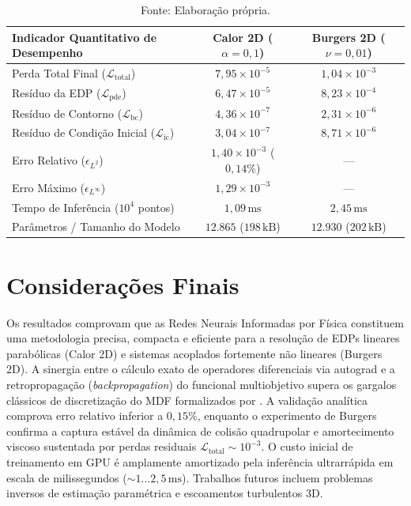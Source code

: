 \documentclass[a4paper, 12pt, twoside]{article}
\begin{document}
\begin{table}[!ht]
\centering
\caption{Síntese dos indicadores quantitativos de convergência e desempenho das PINNs.}
\label{tab:comparison}
\footnotesize
\setlength{\tabcolsep}{3.5pt}
\begin{tabular}{lcc}
\toprule
\textbf{Indicador Quantitativo de Desempenho} & \textbf{Calor 2D ($\alpha = 0{,}1$)} & \textbf{Burgers 2D ($\nu = 0{,}01$)} \\
\midrule
Perda Total Final ($\mathcal{L}_{\mathrm{total}}$) & $7{,}95 \times 10^{-5}$ & $1{,}04 \times 10^{-3}$ \\
Resíduo da EDP ($\mathcal{L}_{\mathrm{pde}}$) & $6{,}47 \times 10^{-5}$ & $8{,}23 \times 10^{-4}$ \\
Resíduo de Contorno ($\mathcal{L}_{\mathrm{bc}}$) & $4{,}36 \times 10^{-7}$ & $2{,}31 \times 10^{-6}$ \\
Resíduo de Condição Inicial ($\mathcal{L}_{\mathrm{ic}}$) & $3{,}04 \times 10^{-7}$ & $8{,}71 \times 10^{-6}$ \\
Erro Relativo ($\epsilon_{L^2}$) & $1{,}40 \times 10^{-3}$ ($0{,}14\%$) & --- \\
Erro Máximo ($\epsilon_{L^\infty}$) & $1{,}29 \times 10^{-3}$ & --- \\
Tempo de Inferência ($10^4$ pontos) & $1{,}09\,\text{ms}$ & $2{,}45\,\text{ms}$ \\
Parâmetros / Tamanho do Modelo & $12.865$ ($198\,\text{kB}$) & $12.930$ ($202\,\text{kB}$) \\
\bottomrule
\end{tabular}
\caption*{Fonte: Elaboração própria.}
\end{table}

\section{Considerações Finais}

Os resultados comprovam que as Redes Neurais Informadas por Física constituem uma metodologia precisa, compacta e eficiente para a resolução de EDPs lineares parabólicas (Calor 2D) e sistemas acoplados fortemente não lineares (Burgers 2D). A sinergia entre o cálculo exato de operadores diferenciais via autograd e a retropropagação (\textit{backpropagation}) do funcional multiobjetivo supera os gargalos clássicos de discretização do MDF formalizados por \textcite{pereira2019}. A validação analítica comprova erro relativo inferior a $0{,}15\%$, enquanto o experimento de Burgers confirma a captura estável da dinâmica de colisão quadrupolar e amortecimento viscoso sustentada por perdas residuais $\mathcal{L}_{\mathrm{total}} \sim 10^{-3}$. O custo inicial de treinamento em GPU é amplamente amortizado pela inferência ultrarrápida em escala de milissegundos ($\sim 1 \dots 2{,}5\,\text{ms}$). Trabalhos futuros incluem problemas inversos de estimação paramétrica e escoamentos turbulentos 3D.

\renewcommand*{\bibfont}{\small}
\setlength{\bibitemsep}{2pt}
\begin{refcontext}[sorting=none]
\printbibliography
\end{refcontext}
\end{document}
